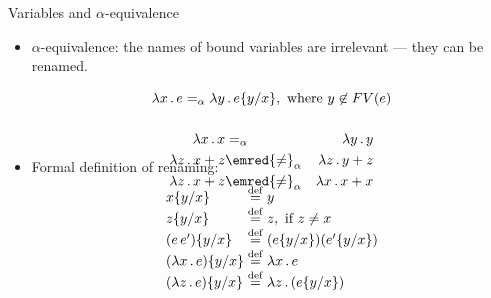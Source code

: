 \documentclass[paper=screen,mode=present,style=zysimple]{powerdot}
\begin{document}
\begin{slide}{Variables and $\alpha$-equivalence}
\begin{itemize}
\item $\alpha$-equivalence: the names of bound variables are irrelevant --- they can be renamed.
\begin{wrap}
\vspace*{-0.8em}
\[
\lambda x \ldot e =_\alpha \lambda y \ldot e \set{y / x},
\mbox{ where } y \not\in FV(e)
\vspace*{-1em}
\]
\end{wrap}
\Example \vspace*{-1em}
\begin{eqnarray*}
\lambda x \ldot x & =_\alpha & \lambda y \ldot y \\ 
\lambda z \ldot x + z & \emred{\neq}_\alpha & \lambda z \ldot y + z \\
\lambda z \ldot x + z & \emred{\neq}_\alpha & \lambda x \ldot x + x \\[-4em]
\end{eqnarray*}
\item Formal definition of renaming: \vspace*{-0.5em}
\[
\begin{array}{l@{\;}l}
x \set{y / x} & \defeq y \\
z \set{y / x} & \defeq z,  \mbox{ if } z \neq x \\
(e \, e') \set{y / x} & \defeq (e \set{y / x}) (e' \set{y / x}) \\
(\lambda x \ldot e) \set{y / x} & \defeq \lambda x \ldot e \\
(\lambda z \ldot e) \set{y / x} & \defeq \lambda z \ldot (e \set{y / x})
\end{array}
\]
\end{itemize}
\end{slide}
\end{document}
